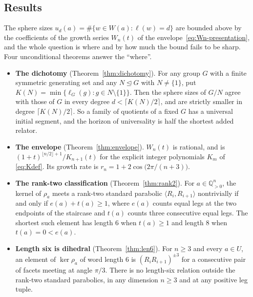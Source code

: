 \documentclass[11pt,a4paper]{article}
\newcommand{\Q}{\mathbb{Q}}
\theoremstyle{definition}
\theoremstyle{remark}
\theoremstyle{plain}
\begin{document}
\subsection{Results}

The sphere sizes $u_d(a)=\#\{w\in W(a):\ell(w)=d\}$ are bounded above by the coefficients of
the growth series $W_n(t)$ of the envelope~\eqref{eq:Wn-presentation}, and the whole question is
where and by how much the bound fails to be sharp. Four unconditional theorems answer the
``where''.

\begin{itemize}[leftmargin=1.4em,itemsep=0.35em]
\item \textbf{The dichotomy} (Theorem~\ref{thm:dichotomy}). For any group $G$ with a finite
symmetric generating set and any $N\trianglelefteq G$ with $N\ne\{1\}$, put
$K(N)=\min\{\ell_G(g):g\in N\setminus\{1\}\}$. Then the sphere sizes of $G/N$ agree with those
of $G$ in every degree $d<\lceil K(N)/2\rceil$, and are strictly smaller in degree
$\lceil K(N)/2\rceil$. So a family of quotients of a fixed $G$ has a universal initial
segment, and the horizon of universality is half the shortest added relator.

\item \textbf{The envelope} (Theorem~\ref{thm:envelope}). $W_n(t)$ is rational, and is
$(1+t)^{\lfloor n/2\rfloor+1}/K_{n+1}(t)$ for the explicit integer polynomials $K_m$ of
\eqref{eq:Kdef}. Its growth rate is $r_n=1+2\cos\bigl(2\pi/(n+3)\bigr)$.

\item \textbf{The rank-two classification} (Theorem~\ref{thm:rank2}). For $a\in\Q_{>0}^n$, the
kernel of $\rho_a$ meets a rank-two standard parabolic $\langle R_i,R_{i+1}\rangle$
nontrivially if and only if $e(a)+t(a)\ge1$, where $e(a)$ counts equal legs at the two
endpoints of the staircase and $t(a)$ counts three consecutive equal legs. The shortest such
element has length $6$ when $t(a)\ge1$ and length $8$ when $t(a)=0<e(a)$.

\item \textbf{Length six is dihedral} (Theorem~\ref{thm:len6}). For $n\ge3$ and every
$a\in U$, an element of $\ker\rho_a$ of word length $6$ is $(R_iR_{i+1})^{\pm3}$ for a
consecutive pair of facets meeting at angle $\pi/3$. There is no length-six relation outside
the rank-two standard parabolics, in any dimension $n\ge3$ and at any positive leg tuple.
\end{itemize}
\end{document}
